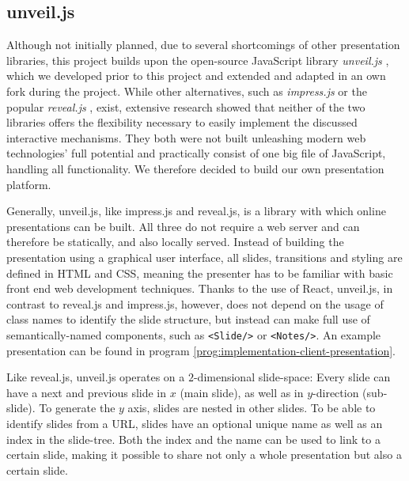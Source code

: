 \subsection{unveil.js}
\label{sec:implementation-technologies-unveil}
Although not initially planned, due to several shortcomings of other presentation libraries, this project builds upon the open-source JavaScript library \emph{unveil.js} \cite{unveil}, which we developed prior to this project and extended and adapted in an own fork \cite{unveil-fork} during the project. While other alternatives, such as \emph{impress.js} \cite{impressjs} or the popular \emph{reveal.js} \cite{revealjs}, exist, extensive research showed that neither of the two libraries offers the flexibility necessary to easily implement the discussed interactive mechanisms. They both were not built unleashing modern web technologies' full potential and practically consist of one big file of JavaScript, handling all functionality. We therefore decided to build our own presentation platform.

Generally, unveil.js, like impress.js and reveal.js, is a library with which online presentations can be built. All three do not require a web server and can therefore be statically, and also locally served. Instead of building the presentation using a graphical user interface, all slides, transitions and styling are defined in HTML and CSS, meaning the presenter has to be familiar with basic front end web development techniques. Thanks to the use of React, unveil.js, in contrast to reveal.js and impress.js, however, does not depend on the usage of class names to identify the slide structure, but instead can make full use of semantically-named components, such as \texttt{<Slide/>} or \texttt{<Notes/>}. An example presentation can be found in program \ref{prog:implementation-client-presentation}.

Like reveal.js, unveil.js operates on a $2$-dimensional slide-space: Every slide can have a next and previous slide in $x$ (main slide), as well as in $y$-direction (sub-slide). To generate the $y$ axis, slides are nested in other slides.
To be able to identify slides from a URL, slides have an optional unique name as well as an index in the slide-tree. Both the index and the name can be used to link to a certain slide, making it possible to share not only a whole presentation but also a certain slide.

